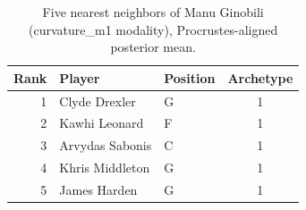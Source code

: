 \begin{table}[htbp]
  \centering\small
  \begin{tabular}{rllc}
    \toprule
    Rank & Player & Position & Archetype \\
    \midrule
    1 & Clyde Drexler & G & 1 \\
    2 & Kawhi Leonard & F & 1 \\
    3 & Arvydas Sabonis & C & 1 \\
    4 & Khris Middleton & G & 1 \\
    5 & James Harden & G & 1 \\
    \bottomrule
  \end{tabular}
  \caption{Five nearest neighbors of Manu Ginobili (curvature_m1 modality), Procrustes-aligned posterior mean.}
  \label{tab:Manu_Ginobili_neighbors_curvature_m1}
\end{table}

